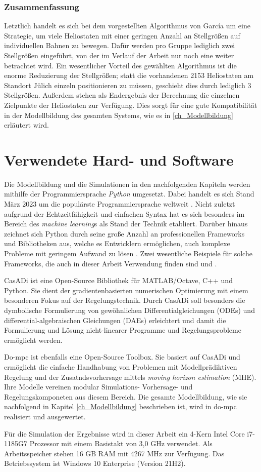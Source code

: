 \subsubsection*{Zusammenfassung} \label{subsubsec_Zusammenfassung}
Letztlich handelt es sich bei dem vorgestellten Algorithmus von García um eine Strategie, um viele Heliostaten mit einer geringen Anzahl an Stellgrößen auf individuellen Bahnen zu bewegen.
Dafür werden pro Gruppe lediglich zwei Stellgrößen eingeführt, von der im Verlauf der Arbeit nur noch eine weiter betrachtet wird.
Ein wesentlicher Vorteil des gewählten Algorithmus ist die enorme Reduzierung der Stellgrößen; statt die vorhandenen 2153 Heliostaten am Standort Jülich einzeln positionieren zu müssen, geschieht dies durch lediglich 3 Stellgrößen.
Außerdem stehen als Endergebnis der Berechnung die einzelnen Zielpunkte der Heliostaten zur Verfügung.
Dies sorgt für eine gute Kompatibilität in der Modellbildung des gesamten Systems, wie es in \ref{ch_Modellbildung} erläutert wird.


\section{Verwendete Hard- und Software} \label{sec_HardSoftware}
Die Modellbildung und die Simulationen in den nachfolgenden Kapiteln werden mithilfe der Programmiersprache \textit{Python} umgesetzt.
Dabei handelt es sich Stand März 2023 um die populärste Programmiersprache weltweit \cite{Statista}.
Nicht zuletzt aufgrund der Echtzeitfähigkeit \cite[S. 9]{Python} und einfachen Syntax hat es sich besonders im Bereich des \textit{machine learning}s als Stand der Technik etabliert.
Darüber hinaus zeichnet sich Python durch seine große Anzahl an professionellen Frameworks und Bibliotheken aus, welche es Entwicklern ermöglichen, auch komplexe Probleme mit geringem Aufwand zu lösen \cite[S. 3]{Python}.
Zwei wesentliche Beispiele für solche Frameworks, die auch in dieser Arbeit Verwendung finden sind  und .

CasADi ist eine Open-Source Bibliothek für MATLAB/Octave, C++ und Python.
Sie dient der gradientenbasierten numerischen Optimierung mit einem besonderen Fokus auf der Regelungstechnik.
Durch CasADi soll besonders die dymbolische Formulierung von gewöhnlichen Differentialgleichungen (ODEs) und differential-algebraischen Gleichungen (DAEs) erleichtert und damit die Formulierung und Lösung nicht-linearer Programme und Regelungsprobleme ermöglicht werden. \cite{Casadi}

Do-mpc ist ebenfalls eine Open-Source Toolbox.
Sie basiert auf CasADi und ermöglicht die einfache Handhabung von Problemen mit Modellprädiktiven Regelung und der Zusatndsvorhersage mittels \textit{moving horizon estimation} (MHE).
Ihre Modelle vereinen modular Simulations- Vorhersage- und Regelungskomponeten aus diesem Bereich. \cite{Dompc2}
Die gesamte Modellbildung, wie sie nachfolgend in Kapitel \ref{ch_Modellbildung} beschrieben ist, wird in do-mpc realisiert und ausgewertet.

Für die Simulation der Ergebnisse wird in dieser Arbeit ein 4-Kern Intel Core i7-1185G7 Prozessor mit einem Basistakt von 3,0 GHz verwendet.
Als Arbeitsspeicher stehen 16 GB RAM mit 4267 MHz zur Verfügung.
Das Betriebssystem ist Windows 10 Enterprise (Version 21H2).
